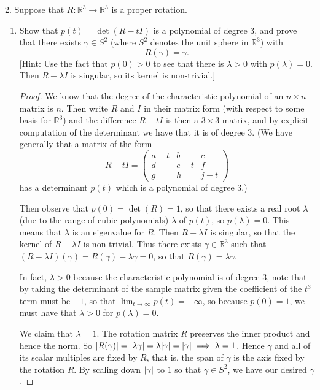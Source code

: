 \documentclass[11pt]{article}
\begin{document}
2. Suppose that $R\colon \mathbb{R}^3\to \mathbb{R}^3$ is a proper rotation. \begin{enumerate}[label=(\alph*)]
  \item Show that $p(t) = \det(R-tI)$ is a polynomial of degree $3$, and prove that there exists $\gamma\in S^2$ (where $S^2$ denotes the unit sphere in $\mathbb{R}^3$) with \[R(\gamma) = \gamma.\] [Hint: Use the fact that $p(0) >0$ to see that there is $\lambda > 0$ with $p(\lambda) = 0$. Then $R-\lambda I$ is singular, so its kernel is non-trivial.]
  \begin{proof}
    We know that the degree of the characteristic polynomial of an $n\times n$ matrix is $n$. Then write $R$ and $I$ in their matrix form (with respect to some basis for $\mathbb{R}^3$) and the difference $R-tI$ is then a $3\times 3$ matrix, and by explicit computation of the determinant we have that it is of degree $3$. (We have generally that a matrix of the form \[R-tI = \begin{pmatrix}
      a-t & b & c \\ d & e-t & f \\ g & h & j-t
    \end{pmatrix}\] has a determinant $p(t)$ which is a polynomial of degree 3.)

    Then observe that $p(0) = \det(R) = 1$, so that there exists a real root $\lambda$ (due to the range of cubic polynomials) $\lambda$ of $p(t)$, so $p(\lambda) = 0$. This means that $\lambda$ is an eigenvalue for $R$. Then $R-\lambda I$ is singular, so that the kernel of $R-\lambda I$ is non-trivial. Thus there exists $\gamma\in \mathbb{R}^3$ such that $(R-\lambda I)(\gamma) = R(\gamma) - \lambda \gamma = 0$, so that $R(\gamma) = \lambda \gamma$.

    In fact, $\lambda > 0$ because the characteristic polynomial is of degree 3, note that by taking the determinant of the sample matrix given the coefficient of the $t^3$ term must be $-1$, so that $\lim_{t\to \infty} p(t) = -\infty$, so because $p(0) = 1$, we must have that $\lambda > 0$ for $p(\lambda) =0$.
    
    We claim that $\lambda = 1$. The rotation matrix $R$ preserves the inner product and hence the norm. So $\abs{R(\gamma)} = \abs{\lambda \gamma} = \lambda \abs{\gamma} = \abs{\gamma} \implies \lambda = 1$. Hence $\gamma$ and all of its scalar multiples are fixed by $R$, that is, the span of $\gamma$ is the axis fixed by the rotation $R$. By scaling down $\abs{\gamma}$ to $1$ so that $\gamma\in S^2$, we have our desired $\gamma$.
  \end{proof}
\end{enumerate}
\end{document}
